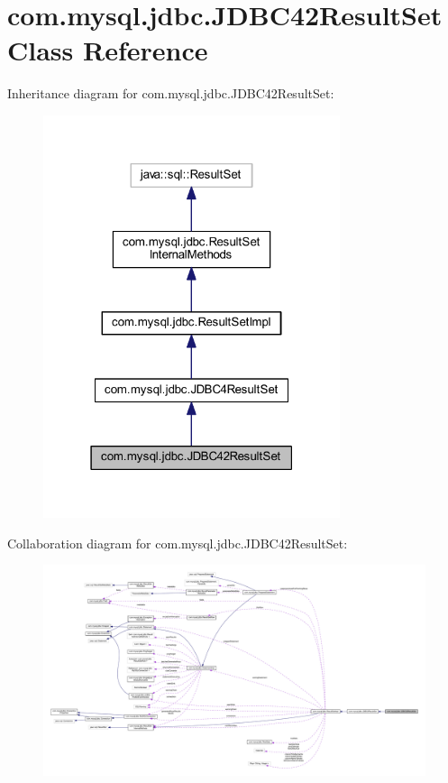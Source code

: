 \hypertarget{classcom_1_1mysql_1_1jdbc_1_1_j_d_b_c42_result_set}{}\section{com.\+mysql.\+jdbc.\+J\+D\+B\+C42\+Result\+Set Class Reference}
\label{classcom_1_1mysql_1_1jdbc_1_1_j_d_b_c42_result_set}


Inheritance diagram for com.\+mysql.\+jdbc.\+J\+D\+B\+C42\+Result\+Set\+:
\nopagebreak
\begin{figure}[H]
\begin{center}
\leavevmode
\includegraphics[width=247pt]{classcom_1_1mysql_1_1jdbc_1_1_j_d_b_c42_result_set__inherit__graph}
\end{center}
\end{figure}


Collaboration diagram for com.\+mysql.\+jdbc.\+J\+D\+B\+C42\+Result\+Set\+:
\nopagebreak
\begin{figure}[H]
\begin{center}
\leavevmode
\includegraphics[width=350pt]{classcom_1_1mysql_1_1jdbc_1_1_j_d_b_c42_result_set__coll__graph}
\end{center}
\end{figure}
